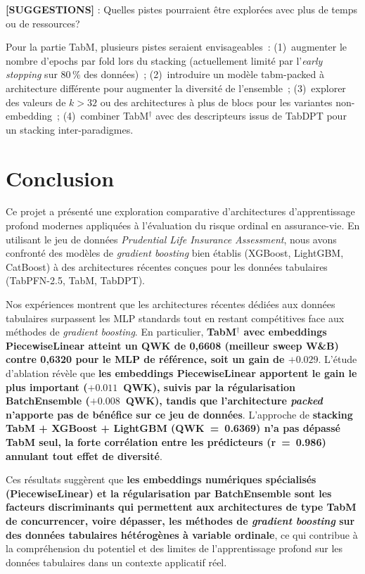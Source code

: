 \documentclass[conference]{IEEEtran}
\begin{document}
\textbf{[SUGGESTIONS]} : Quelles pistes pourraient être explorées avec plus de temps ou de
ressources?

Pour la partie TabM, plusieurs pistes seraient envisageables~: (1)~augmenter le nombre
d'epochs par fold lors du stacking (actuellement limité par l'\textit{early stopping} sur
80\,\% des données)~; (2)~introduire un modèle tabm-packed à architecture différente pour
augmenter la diversité de l'ensemble~; (3)~explorer des valeurs de $k>32$ ou des architectures
à plus de blocs pour les variantes non-embedding~; (4)~combiner TabM$^\dagger$ avec des
descripteurs issus de TabDPT pour un stacking inter-paradigmes.

\section{Conclusion}

Ce projet a présenté une exploration comparative d'architectures d'apprentissage profond
modernes appliquées à l'évaluation du risque ordinal en assurance-vie. En utilisant le
jeu de données \textit{Prudential Life Insurance Assessment}, nous avons confronté des
modèles de \textit{gradient boosting} bien établis (XGBoost, LightGBM, CatBoost) à des
architectures récentes conçues pour les données tabulaires (TabPFN-2.5, TabM, TabDPT).

Nos expériences montrent que les architectures récentes dédiées aux données tabulaires
surpassent les MLP standards tout en restant compétitives face aux méthodes de
\textit{gradient boosting}. En particulier,
\textbf{TabM$^\dagger$ avec embeddings PiecewiseLinear atteint un QWK de 0,6608 (meilleur
sweep W\&B) contre 0,6320 pour le MLP de référence, soit un gain de $+0.029$}.
L'étude d'ablation révèle que \textbf{les embeddings PiecewiseLinear apportent le gain le
plus important ($+0.011$~QWK), suivis par la régularisation BatchEnsemble ($+0.008$~QWK),
tandis que l'architecture \textit{packed} n'apporte pas de bénéfice sur ce jeu de données}.
L'approche de \textbf{stacking TabM + XGBoost + LightGBM (QWK~=~0.6369) n'a pas dépassé
TabM seul, la forte corrélation entre les prédicteurs (r~=~0.986) annulant tout effet de
diversité}.

Ces résultats suggèrent que \textbf{les embeddings numériques spécialisés (PiecewiseLinear)
et la régularisation par BatchEnsemble sont les facteurs discriminants qui permettent aux
architectures de type TabM de concurrencer, voire dépasser, les méthodes de \textit{gradient
boosting} sur des données tabulaires hétérogènes à variable ordinale}, ce qui contribue à la compréhension
du potentiel et des limites de l'apprentissage profond sur les données tabulaires dans un
contexte applicatif réel.
\end{document}
